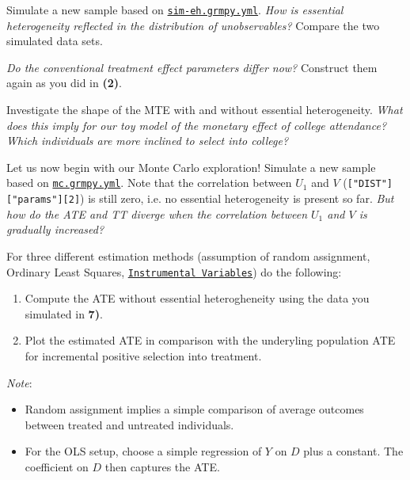 \begin{boenumerate}\setcounter{enumi}{3}
  
  \item Simulate a new sample based on \href{https://github.com/HumanCapitalAnalysis/microeconometrics/tree/peisenha_integration_problem_set/problem-sets/01-potential-outcome-model/data}{\texttt{sim-eh.grmpy.yml}}. \emph{How is essential heterogeneity reflected in the distribution of unobservables?} Compare the two simulated data sets.
  
  \item \emph{Do the conventional treatment effect parameters differ now?} Construct them again as you did in \textbf{(2)}.
  
  \item Investigate the shape of the MTE with and without essential heterogeneity. \emph{What does this imply for our toy model of the monetary effect of college attendance? Which individuals are more inclined to select into college?}
  
  \item Let us now begin with our Monte Carlo exploration! Simulate a new sample based on \href{https://github.com/HumanCapitalAnalysis/microeconometrics/tree/peisenha_integration_problem_set/problem-sets/01-potential-outcome-model/data}{\texttt{mc.grmpy.yml}}. Note that the correlation between $U_1$ and $V$ (\texttt{["DIST"]["params"][2]}) is still zero, i.e. no essential heterogeneity is present so far. \emph{But how do the ATE and TT diverge when the correlation between $U_1$ and $V$ is gradually increased?}
  
  \item For three different estimation methods (assumption of random assignment, Ordinary Least Squares, \href{https://bashtage.github.io/linearmodels/doc/iv/introduction.html}{\texttt{Instrumental Variables}}) do the following:
  \begin{enumerate}
  	\item Compute the ATE without essential heterogheneity using the data you simulated in \textbf{7)}.
  	\item Plot the estimated ATE in comparison with the underyling population ATE for incremental positive selection into treatment. 
  	
  \end{enumerate}

  \textit{Note}: 
  \begin{itemize}
  	\item Random assignment implies a simple comparison of average outcomes between treated and untreated individuals.
  	\item For the OLS setup, choose a simple regression of $Y$ on $D$ plus a constant. The coefficient on $D$ then captures the ATE. 
  	

\end{itemize}
\end{boenumerate}
